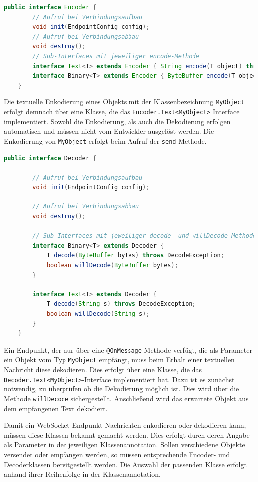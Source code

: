 \documentclass[11pt,a4paper,titlepage]{scrartcl}
\numberwithin{equation}{section}
\begin{document}
\begin{lstlisting}[frame=single, language=Java, caption=Java: Encoder Interface]
	public interface Encoder {
		// Aufruf bei Verbindungsaufbau
		void init(EndpointConfig config);
		// Aufruf bei Verbindungsabbau
		void destroy();
		// Sub-Interfaces mit jeweiliger encode-Methode
		interface Text<T> extends Encoder { String encode(T object) throws EncodeException; }
		interface Binary<T> extends Encoder { ByteBuffer encode(T object) throws EncodeException; }
	}
\end{lstlisting}

\noindent Die textuelle Enkodierung eines Objekts mit der Klassenbezeichnung \texttt{MyObject} erfolgt demnach über eine Klasse, die das \texttt{Encoder.Text<MyObject>} Interface implementiert. Sowohl die Enkodierung, als auch die Dekodierung erfolgen automatisch und müssen nicht vom Entwickler ausgelöst werden. Die Enkodierung von \texttt{MyObject} erfolgt beim Aufruf der \texttt{send}-Methode. \medskip

\begin{lstlisting}[frame=single, language=Java, caption=Java: Decoder Interface]
	public interface Decoder {
	
		// Aufruf bei Verbindungsaufbau
		void init(EndpointConfig config);
		
		// Aufruf bei Verbindungsabbau
		void destroy();
		
		// Sub-Interfaces mit jeweiliger decode- und willDecode-Methode
		interface Binary<T> extends Decoder {
			T decode(ByteBuffer bytes) throws DecodeException;
			boolean willDecode(ByteBuffer bytes);
		}
		
		interface Text<T> extends Decoder {
			T decode(String s) throws DecodeException;
			boolean willDecode(String s);
		}
	}
\end{lstlisting}

\noindent Ein Endpunkt, der nur über eine \texttt{@OnMessage}-Methode verfügt, die als Parameter ein Objekt vom Typ \texttt{MyObject} empfängt, muss beim Erhalt einer textuellen Nachricht diese dekodieren. Dies erfolgt über eine Klasse, die das \texttt{Decoder.Text<MyObject>}-Interface implementiert hat. Dazu ist es zunächst notwendig, zu überprüfen ob die Dekodierung möglich ist. Dies wird über die Methode \texttt{willDecode} sichergestellt. Anschließend wird das erwartete Objekt aus dem empfangenen Text dekodiert.\medskip

\noindent Damit ein WebSocket-Endpunkt Nachrichten enkodieren oder dekodieren kann, müssen diese Klassen bekannt gemacht werden. Dies erfolgt durch deren Angabe als Parameter in der jeweiligen Klassenannotation. Sollen verschiedene Objekte versendet oder empfangen werden, so müssen entsprechende Encoder- und Decoderklassen bereitgestellt werden. Die Auswahl der passenden Klasse erfolgt anhand ihrer Reihenfolge in der Klassenannotation.\medskip
\end{document}
